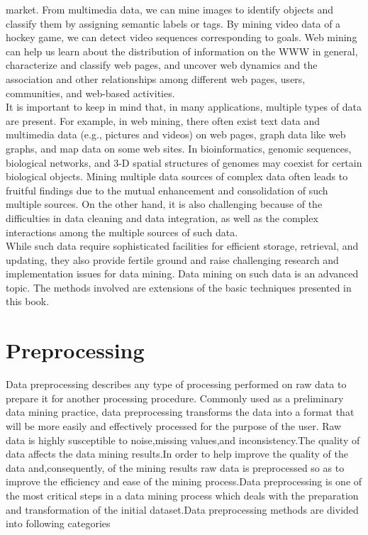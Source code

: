 market. From multimedia data, we can mine images to identify objects and classify them by assigning semantic
labels or tags. By mining video data of a hockey game, we can detect video sequences corresponding to goals.
Web mining can help us learn about the distribution of information on the WWW in general, characterize and
classify web pages, and uncover web dynamics and the association and other relationships among different web
pages, users, communities, and web-based activities.\\
It is important to keep in mind that, in many applications, multiple types of data are present. For example, in
web mining, there often exist text data and multimedia data (e.g., pictures and videos) on web pages, graph data
like web graphs, and map data on some web sites. In bioinformatics, genomic sequences, biological networks,
and 3-D spatial structures of genomes may coexist for certain biological objects. Mining multiple data sources
of complex data often leads to fruitful findings due to the mutual enhancement and consolidation of such
multiple sources. On the other hand, it is also challenging because of the difficulties in data cleaning and data
integration, as well as the complex interactions among the multiple sources of such data.\\
While such data require sophisticated facilities for efficient storage, retrieval, and updating, they also provide
fertile ground and raise challenging research and implementation issues for data mining. Data mining on such
data is an advanced topic. The methods involved are extensions of the basic techniques presented in this book.

\section{Preprocessing}

Data preprocessing describes any type of processing performed on raw data to prepare it for another processing procedure. Commonly used as a preliminary data mining practice, data preprocessing transforms the data into a format that will be more easily and effectively processed for the purpose of the user. \newline
Raw data is highly susceptible to noise,missing values,and inconsistency.The quality of data affects the data mining results.In order to help improve the quality of the data and,consequently, of the mining results raw data is preprocessed so as to improve the efficiency and ease of the mining process.Data preprocessing is one of the most critical steps in a data mining process which deals with the preparation and transformation of the initial dataset.Data preprocessing methods are divided into following categories

